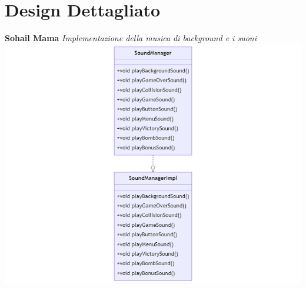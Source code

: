 \documentclass[a4paper,12pt]{report}
\begin{document}
\section{Design Dettagliato}
\textbf{Sohail Mama}
\newline
\newline
\textit{Implementazione della musica di background e i suoni}
\newline
\includegraphics[width=\textwidth]{SoundManager.png}
\newline
\end{document}

